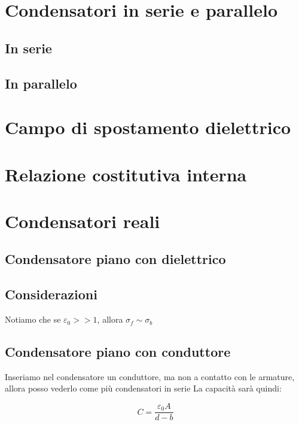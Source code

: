 \documentclass{book}
\begin{document}
\section{Condensatori in serie e parallelo}
\subsection{In serie}
\subsection{In parallelo}
\section{Campo di spostamento dielettrico}
\section{Relazione costitutiva interna}
\section{Condensatori reali}

\subsection{Condensatore piano con dielettrico}











\subsection{Considerazioni}




Notiamo che se $\varepsilon_0 >> 1$, allora $\sigma_f \sim \sigma_b$

\subsection{Condensatore piano con conduttore}
Inseriamo nel condensatore un conduttore, ma non a contatto con le armature, allora posso vederlo come più condensatori in serie
La capacità sarà quindi:


$$
C = \frac{\varepsilon_0 A}{d-b}
$$
\end{document}
